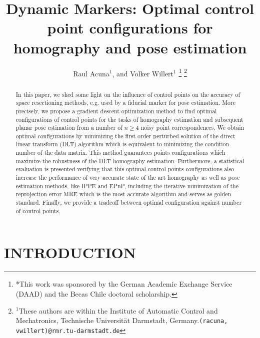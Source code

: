 \documentclass[letterpaper, 10 pt, conference]{ieeeconf}  %
\title{\LARGE \bf
	Dynamic Markers: Optimal control point configurations for homography and pose estimation
}
\author{Raul Acuna$^{1}$, and Volker Willert$^{1}$%
	\thanks{*This work was sponsored by the German Academic Exchange Service (DAAD) and the Becas Chile doctoral scholarship.}%
	\thanks{$^{1}$These authors are within the Institute of Automatic Control and Mechatronics, Technische Universit{\"a}t Darmstadt, Germany.{\tt\small (racuna, vwillert)}{\tt\small @rmr.tu-darmstadt.de}}}
\begin{document}
	\maketitle
	\thispagestyle{empty}
	\pagestyle{empty}
	\begin{abstract}
		In this paper, we shed some light on the influence of control points on the accuracy of space resectioning methods, e.g. used by a fiducial marker for pose estimation. More precisely, we propose a gradient descent optimization method to find optimal configurations of control points for the tasks of homography estimation and subsequent planar pose estimation from a number of $n \geq 4$ noisy point correspondences. We obtain optimal configurations by minimizing the first order perturbed solution of the direct linear transform (DLT) algorithm which is equivalent to minimizing the condition number of the data matrix. This method guarantees points configurations which maximize the robustness of the DLT homography estimation.
		Furthermore, a statistical evaluation is presented verifying that this optimal control points configurations also increase the performance of very accurate state of the art homography as well as pose estimation methods, like IPPE and EPnP, including the iterative minimization of the reprojection error MRE which is the most accurate algorithm and serves as golden standard. Finally, we provide a tradeoff between optimal configuration against number of control points.
	\end{abstract}
	
	
	\section{INTRODUCTION}
	
\end{document}
